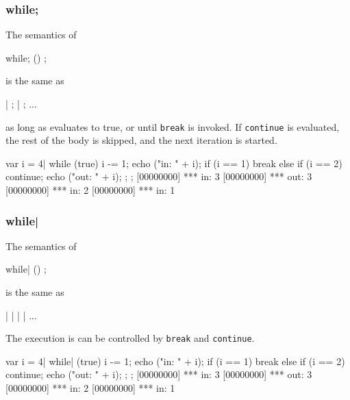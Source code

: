 \subsubsection{while;}

The semantics of

\begin{urbiunchecked}
while; ()
  ;
\end{urbiunchecked}

\noindent
is the same as

\begin{urbiunchecked}
 |  ;  |  ; ...
\end{urbiunchecked}

\noindent
as long as  evaluates to true, or until \lstinline|break| is
invoked.  If \lstinline|continue| is evaluated, the rest of the body
is skipped, and the next iteration is started.

\begin{urbiscript}
{
  var i = 4|
  while (true)
  {
    i -= 1;
    echo ("in: " + i);
    if (i == 1)
      break
    else if (i == 2)
      continue;
    echo ("out: " + i);
  };
};
[00000000] *** in: 3
[00000000] *** out: 3
[00000000] *** in: 2
[00000000] *** in: 1
\end{urbiscript}


\subsubsection{while|}

The semantics of

\begin{urbiunchecked}
while| ()
  ;
\end{urbiunchecked}

\noindent
is the same as

\begin{urbiunchecked}
 |  |  |  | ...
\end{urbiunchecked}

The execution is can be controlled by \lstinline|break| and
\lstinline|continue|.

\begin{urbiscript}
{
  var i = 4|
  while| (true)
  {
    i -= 1;
    echo ("in: " + i);
    if (i == 1)
      break
    else if (i == 2)
      continue;
    echo ("out: " + i);
  };
};
[00000000] *** in: 3
[00000000] *** out: 3
[00000000] *** in: 2
[00000000] *** in: 1
\end{urbiscript}


